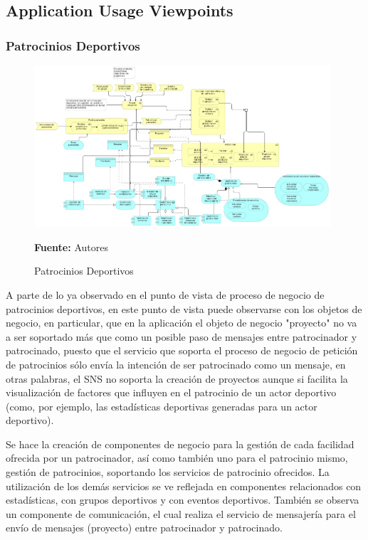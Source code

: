 \subsection{Application Usage Viewpoints}

\subsubsection{Patrocinios Deportivos}

\begin{figure}[!htb]
  \begin{center}
    \includegraphics[width=11cm]{./imagenes/application_usage/patrociniosdeportivos.png}
    \caption{Patrocinios Deportivos}
    \label{fig:au_patrocinios_deportivos}
    \textbf{Fuente:}  Autores
  \end{center}
\end{figure}

A parte de lo ya observado en el punto de vista de proceso de negocio de patrocinios deportivos, en este punto de vista puede observarse con los objetos de negocio, en particular, que en la aplicación el objeto de negocio "proyecto" no va a ser soportado más que como un posible paso de mensajes entre patrocinador y patrocinado, puesto que el servicio que soporta el proceso de negocio de petición de patrocinios sólo envía la intención de ser patrocinado como un mensaje, en otras palabras, el SNS no soporta la creación de proyectos aunque si facilita la visualización de factores que influyen en el patrocinio de un actor deportivo (como, por ejemplo, las estadísticas deportivas generadas para un actor deportivo).

Se hace la creación de componentes de negocio para la gestión de cada facilidad ofrecida por un patrocinador, así como también uno para el patrocinio mismo, gestión de patrocinios, soportando los servicios de patrocinio ofrecidos. La utilización de los demás servicios se ve reflejada en componentes relacionados con estadísticas, con grupos deportivos y con eventos deportivos. También se observa un componente de comunicación, el cual realiza el servicio de mensajería para el envío de mensajes (proyecto) entre patrocinador y patrocinado.

